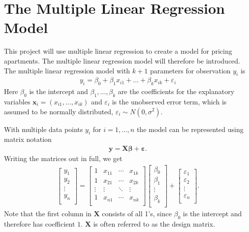 \section{The Multiple Linear Regression Model}

This project will use multiple linear regression to create a model for pricing apartments. The multiple linear regression model will therefore be introduced. The multiple linear regression model with $k+1$ parameters for observation $y_i$ is
\begin{align}\label{eq:multiple_linear_regression}
  y_i = \beta_0 + \beta_1 x_{i1} + \ldots + \beta_k x_{ik} + \varepsilon_i
\end{align}
Here $\beta_0$ is the intercept and $\beta_1, \ldots, \beta_k$ are the coefficients for the explanatory variables $\textbf{x}_i = (x_{i1}, \ldots, x_{ik})$ and $\varepsilon_i$ is the unobserved error term, which is assumed to be normally distributed, $\varepsilon_i \sim N(0, \sigma^2)$. 

With multiple data points $y_i$ for $i = 1, \ldots, n$ the model can be represented using matrix notation
\begin{align}\label{eq:multiple_linear_regression_model}
    \mathbf{y} = \mathbf{X} \boldsymbol{\beta} + \boldsymbol{\varepsilon}.
\end{align}
Writing the matrices out in full, we get
\begin{align}
  \begin{bmatrix}
    y_1 \\ y_2 \\ \vdots \\ y_n \\
  \end{bmatrix}
  =
  \begin{bmatrix}
    1 & x_{11} & \cdots & x_{1k} \\
    1 & x_{21} & \cdots & x_{2k} \\ \vdots & \vdots & \ddots & \vdots \\ 1 & x_{n1} & \cdots & x_{nk} \\
  \end{bmatrix}
  \begin{bmatrix}
    \beta_0 \\ \beta_1 \\ \vdots \\ \beta_k \\
  \end{bmatrix} +
  \begin{bmatrix}
    \varepsilon_1 \\ \varepsilon_2 \\ \vdots \\ \varepsilon_n \\
  \end{bmatrix}.
\end{align}
Note that the first column  in $\boldsymbol{X}$ consists of all 1's, since $\beta_{0}$ is the intercept and therefore has coefficient $1$. $\textbf{X}$ is often referred to as the design matrix. 

